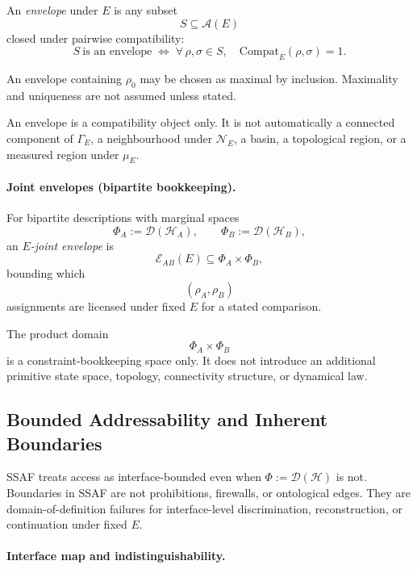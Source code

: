 \documentclass[aps,prx,onecolumn,11pt]{revtex4-2}
\theoremstyle{plain}
\theoremstyle{definition}
\theoremstyle{remark}
\begin{document}
An \emph{envelope} under \(E\) is any subset
\[
S\subseteq\mathcal A(E)
\]
closed under pairwise compatibility:
\begin{equation}
S\ \text{is an envelope}
\;\Longleftrightarrow\;
\forall\,\rho,\sigma\in S,\quad
\mathrm{Compat}_E(\rho,\sigma)=1.
\label{eq:compat_envelope_def_core}
\end{equation}

An envelope containing \(\rho_0\) may be chosen as maximal by inclusion.
Maximality and uniqueness are not assumed unless stated.

An envelope is a compatibility object only. It is not automatically a
connected component of \(\Gamma_E\), a neighbourhood under
\(\mathcal N_E\), a basin, a topological region, or a measured region
under \(\mu_E\).

\paragraph{Joint envelopes (bipartite bookkeeping).}

For bipartite descriptions with marginal spaces
\[
\Phi_A:=\mathcal D(\mathcal H_A),
\qquad
\Phi_B:=\mathcal D(\mathcal H_B),
\]
an \emph{\(E\)-joint envelope} is
\begin{equation}
\mathcal E_{AB}(E)
\subseteq
\Phi_A\times\Phi_B,
\label{eq:joint_envelope_def_core}
\end{equation}
bounding which
\[
(\rho_A,\rho_B)
\]
assignments are licensed under fixed \(E\) for a stated comparison.

The product domain
\[
\Phi_A\times\Phi_B
\]
is a constraint-bookkeeping space only. It does not introduce an
additional primitive state space, topology, connectivity structure, or
dynamical law.

\subsection{Bounded Addressability and Inherent Boundaries}
\label{subsec:bounded_addressability_boundaries}

SSAF treats access as interface-bounded even when
\(\Phi := \mathcal{D}(\mathcal{H})\) is not. Boundaries in SSAF are not
prohibitions, firewalls, or ontological edges. They are
domain-of-definition failures for interface-level discrimination,
reconstruction, or continuation under fixed \(E\).

\paragraph{Interface map and indistinguishability.}
\end{document}
